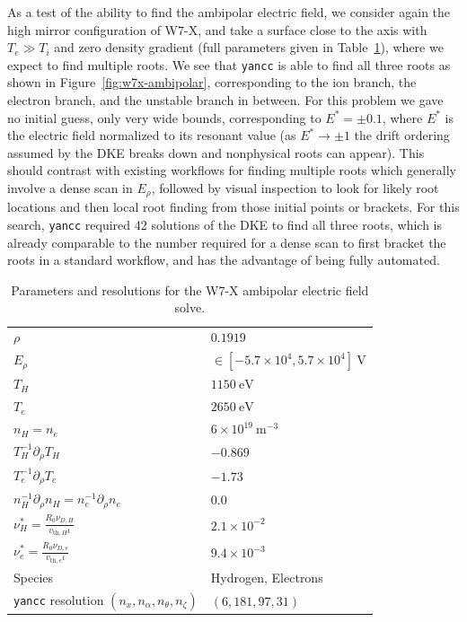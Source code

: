 \documentclass[11pt]{article}
\newcommand{\yancc}{\texttt{yancc}}
\begin{document}
As a test of the ability to find the ambipolar electric field, we consider again the
high mirror configuration of W7-X, and take a surface close to the axis with
$T_e \gg T_i$ and zero density gradient (full parameters given in
Table~\ref{tab:w7x-ambipolar}), where we expect to find multiple roots. We see that
\yancc{} is able to find all three roots as shown in Figure~\ref{fig:w7x-ambipolar},
corresponding to the ion branch, the electron branch, and the unstable branch in
between. For this problem we gave no initial guess, only very wide bounds,
corresponding to $E^* = \pm 0.1$, where $E^*$ is the electric field normalized to its
resonant value (as $E^* \rightarrow \pm 1$ the drift ordering assumed by the DKE breaks
down and nonphysical roots can appear). This should contrast with existing workflows
for finding multiple roots which generally involve a dense scan in $E_\rho$, followed
by visual inspection to look for likely root locations and then local root finding from
those initial points or brackets. For this search, \yancc{} required 42 solutions of the
DKE to find all three roots, which is already comparable to the number required for a
dense scan to first bracket the roots in a standard workflow, and has the advantage
of being fully automated.


\begin{table}[htbp]
\centering
\begin{tabular}{ll}
\toprule
$\rho$ & $0.1919$ \\
$E_\rho$ & $\in [-5.7 \times 10^4, 5.7 \times 10^4] ~\mathrm{V}$ \\
$T_H$ &  $1150 ~\mathrm{eV}$\\
$T_e$ & $2650 ~\mathrm{eV}$ \\
$n_H = n_e$ & $6 \times 10^{19}~\mathrm{m}^{-3}$ \\
$T_H^{-1} \partial_\rho T_H$ & $-0.869$ \\
$T_e^{-1} \partial_\rho T_e$ & $-1.73$ \\
$n_H^{-1} \partial_\rho n_H = n_e^{-1} \partial_\rho n_e$ & $0.0$ \\
$\nu^*_H = \frac{R_0 \nu_{D,H}}{v_{\mathrm{th},H} \iota}$ & $2.1 \times 10^{-2}$ \\
$\nu^*_e = \frac{R_0 \nu_{D,e}}{v_{\mathrm{th},e} \iota}$ & $9.4 \times 10^{-3}$ \\
Species & Hydrogen, Electrons \\
\yancc{} resolution $(n_x, n_\alpha, n_\theta, n_\zeta)$ & $(6, 181, 97, 31)$ \\
\bottomrule
\end{tabular}
\caption{Parameters and resolutions for the W7-X ambipolar electric field solve.}
\label{tab:w7x-ambipolar}
\end{table}
\end{document}
